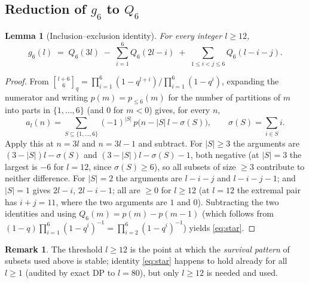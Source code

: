\documentclass[11pt,reqno]{article}
\newtheorem{lemma}[theorem]{Lemma}
\theoremstyle{definition}
\newtheorem{remark}[theorem]{Remark}
\newcommand{\ggbrack}[2]{\genfrac{[}{]}{0pt}{}{#1}{#2}_q}
\begin{document}
\subsection{Reduction of $g_6$ to $Q_6$}
\begin{lemma}[Inclusion--exclusion identity]\label{lem:star}
For every integer $l\ge 12$,
\begin{equation}\label{eq:star}
g_6(l)\;=\;Q_6(3l)\;-\;\sum_{i=1}^{6}Q_6(2l-i)\;+\;\sum_{1\le i<j\le 6}Q_6(l-i-j) .
\tag{$*$}
\end{equation}
\end{lemma}
\begin{proof}
From $\ggbrack{l+6}{6}=\prod_{i=1}^6(1-q^{l+i})\big/\prod_{i=1}^6(1-q^i)$, expanding the numerator and writing $p(m)=p_{\le 6}(m)$ for the number of partitions of $m$ into parts in $\{1,\dots,6\}$ (and $0$ for $m<0$) gives, for every $n$,
\[
a_l(n)=\sum_{S\subseteq\{1,\dots,6\}}(-1)^{|S|}\,p\bigl(n-|S|\,l-\sigma(S)\bigr),
\qquad \sigma(S)=\sum_{i\in S}i .
\]
Apply this at $n=3l$ and $n=3l-1$ and subtract. For $|S|\ge3$ the arguments are $(3-|S|)l-\sigma(S)$ and $(3-|S|)l-\sigma(S)-1$, both negative (at $|S|=3$ the largest is $-6$ for $l=12$, since $\sigma(S)\ge6$), so all subsets of size $\ge3$ contribute to neither difference. For $|S|=2$ the arguments are $l-i-j$ and $l-i-j-1$; and $|S|=1$ gives $2l-i$, $2l-i-1$; all are $\ge 0$ for $l\ge 12$ (at $l=12$ the extremal pair has $i+j=11$, where the two arguments are $1$ and $0$). Subtracting the two identities and using $Q_6(m)=p(m)-p(m-1)$ (which follows from $(1-q)\prod_{i=1}^6(1-q^i)^{-1}=\prod_{i=2}^6(1-q^i)^{-1}$) yields \eqref{eq:star}.
\end{proof}

\begin{remark}
The threshold $l\ge12$ is the point at which the \emph{survival pattern} of subsets used above is stable; identity \eqref{eq:star} happens to hold already for all $l\ge1$ (audited by exact DP to $l=80$), but only $l\ge12$ is needed and used.
\end{remark}
\end{document}
